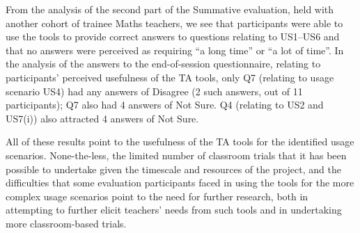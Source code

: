 From the analysis of the second part of the Summative
evaluation, held with another cohort of trainee Maths teachers, 
we see that participants were able to use the tools to provide
correct answers to questions relating to US1--US6 and that no
answers were perceived as requiring ``a long time'' or ``a lot of time''.
In the analysis of the answers to the end-of-session questionnaire,
relating to participants' perceived usefulness of the TA tools, 
only Q7 (relating to usage scenario US4) had any answers of Disagree 
(2 such answers, out of 11 participants); Q7 also had 4 answers of Not Sure.
Q4 (relating to US2 and US7(i)) also attracted 4 answers of Not Sure. 


All of these results point to the usefulness of the TA tools for the
identified usage scenarios. 
None-the-less, the limited number of classroom trials that
it has been possible to undertake given the timescale and resources of
the project, and the difficulties that some evaluation participants
faced in using the tools for the more complex usage scenarios 
point to the need for
further research, both in attempting to further elicit teachers' needs
from such tools and in undertaking more classroom-based trials.


% 
% 
 
